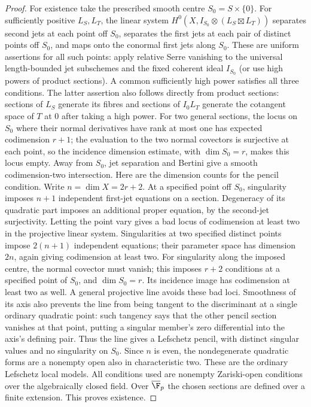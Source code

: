 \begin{proof}
For existence take the prescribed smooth centre $S_0=S\times\{0\}$.
For sufficiently positive $L_S,L_T$, the linear system
$H^0(X,I_{S_0}\otimes(L_S\boxtimes L_T))$ separates second jets
at each point off $S_0$, separates the first jets at each pair of
distinct points off $S_0$, and maps onto the conormal first jets
along $S_0$. These are uniform assertions for all such points:
apply relative Serre vanishing to the universal length-bounded
jet subschemes and the fixed coherent ideal $I_{S_0}$ (or use
high powers of product sections). A common sufficiently high
power satisfies all three conditions.
The latter assertion also follows directly from product sections:
sections of $L_S$ generate its fibres and sections of $I_0L_T$
generate the cotangent space of $T$ at $0$ after taking a high power.
For two general sections, the locus on $S_0$ where their normal
derivatives have rank at most one has expected codimension $r+1$;
the evaluation to the two normal covectors is surjective at each
point, so the incidence dimension estimate, with $\dim S_0=r$,
makes this locus empty. Away from $S_0$, jet separation and
Bertini give a smooth codimension-two intersection. Here are the
dimension counts for the pencil condition. Write $n=\dim X=2r+2$.
At a specified point off $S_0$, singularity imposes $n+1$
independent first-jet equations on a section. Degeneracy of its
quadratic part imposes an additional proper equation, by the
second-jet surjectivity. Letting the point vary gives a bad locus
of codimension at least two in the projective linear system.
Singularities at two specified distinct points impose $2(n+1)$
independent equations; their parameter space has dimension $2n$,
again giving codimension at least two. For singularity along the
imposed centre, the normal covector must vanish; this imposes
$r+2$ conditions at a specified point of $S_0$, and $\dim S_0=r$.
Its incidence image has codimension at least two as well. A general
projective line avoids these bad loci. Smoothness of its axis
also prevents the line from being tangent to the discriminant at
a single ordinary quadratic point: such tangency says that the
other pencil section vanishes at that point, putting a singular
member's zero differential into the axis's defining pair.
Thus the line gives a Lefschetz pencil, with distinct singular
values and no singularity on $S_0$. Since $n$ is even, the
nondegenerate quadratic forms are a nonempty open also in
characteristic two. These are the ordinary Lefschetz local models.
All conditions used are nonempty Zariski-open conditions over the
algebraically closed field. Over $\overline{\F}_p$ the chosen
sections are defined over a finite extension. This proves existence.
\end{proof}

